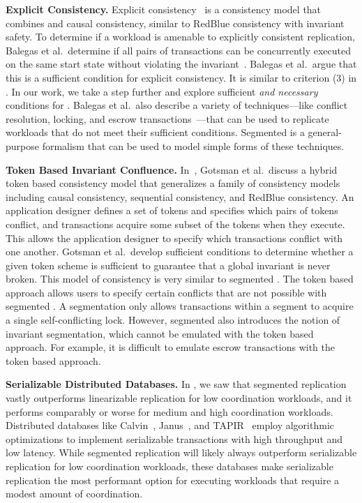 \textbf{Explicit Consistency.}
Explicit consistency~\cite{balegas2015towards} is a consistency model that
combines \invariantconfluence{} and causal consistency, similar to RedBlue
consistency with invariant safety. To determine if a workload is amenable to
explicitly consistent replication, Balegas et al.\ determine if all pairs of
transactions can be concurrently executed on the same start state without
violating the invariant~\cite{balegas2015towards}. Balegas et al.\ argue that
this is a sufficient condition for explicit consistency. It is similar to
criterion (3) in . In our work, we take a step further
and explore sufficient \emph{and necessary} conditions for
\invariantconfluence{}.
%
Balegas et al.\ also describe a variety of techniques---like conflict
resolution, locking, and escrow transactions~\cite{o1986escrow}---that can be
used to replicate workloads that do not meet their sufficient conditions.
Segmented \invariantconfluence{} is a general-purpose formalism that can be
used to model simple forms of these techniques.

\textbf{Token Based Invariant Confluence.}
In~\cite{gotsman2016cause}, Gotsman et al.\ discuss a hybrid token based
consistency model that generalizes a family of consistency models including
causal consistency, sequential consistency, and RedBlue consistency. An
application designer defines a set of tokens and specifies which pairs of
tokens conflict, and transactions acquire some subset of the tokens when they
execute. This allows the application designer to specify which transactions
conflict with one another.  Gotsman et al.\ develop sufficient conditions to
determine whether a given token scheme is sufficient to guarantee that a global
invariant is never broken. This model of consistency is very similar to
segmented \invariantconfluence{}. The token based approach allows users to
specify certain conflicts that are not possible with segmented
\invariantconfluence{}. A segmentation only allows transactions within a
segment to acquire a single self-conflicting lock. However, segmented
\invariantconfluence{} also introduces the notion of invariant segmentation,
which cannot be emulated with the token based approach. For example, it is
difficult to emulate escrow transactions with the token based approach.

\textbf{Serializable Distributed Databases.}
In , we saw that segmented \invariantconfluent{} replication
vastly outperforms linearizable replication for low coordination workloads, and
it performs comparably or worse for medium and high coordination workloads.
Distributed databases like Calvin~\cite{thomson2012calvin},
Janus~\cite{mu2016consolidating}, and TAPIR~\cite{zhang2015building} employ
algorithmic optimizations to implement serializable transactions with high
throughput and low latency.
%
While segmented \invariantconfluent{} replication will likely always outperform
serializable replication for low coordination workloads, these databases make
serializable replication the most performant option for executing workloads
that require a modest amount of coordination.


